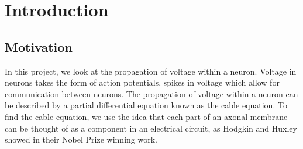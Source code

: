 \documentclass{article}
\begin{document}
\section{Introduction}
\subsection{Motivation}
In this project, we look at the propagation of voltage within a neuron. Voltage in neurons takes the form of action potentials, spikes in voltage which allow for communication between neurons. The propagation of voltage within a neuron can be described by a partial differential equation known as the cable equation. To find the cable equation, we use the idea that each part of an axonal membrane can be thought of as a component in an electrical circuit, as Hodgkin and Huxley showed in their Nobel Prize winning work.
\end{document}
